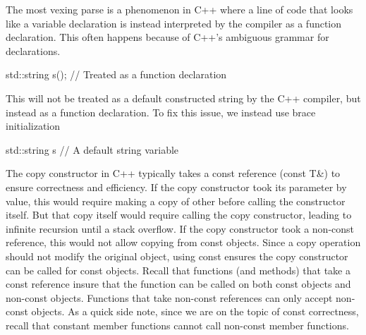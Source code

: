 \documentclass{report}
\begin{document}
    \pagebreak 
    \bigbreak \noindent 
    The most vexing parse is a phenomenon in C++ where a line of code that looks like a variable declaration is instead interpreted by the compiler as a function declaration. This often happens because of C++'s ambiguous grammar for declarations.
    \bigbreak \noindent 
    \begin{cppcode}
    std::string s(); // Treated as a function declaration
    \end{cppcode}
    \bigbreak \noindent 
    This will not be treated as a default constructed string by the C++ compiler, but instead as a function declaration. To fix this issue, we instead use brace initialization
    \bigbreak \noindent 
    \begin{cppcode}
        std::string s{} // A default string variable
    \end{cppcode}

    \pagebreak 
    \bigbreak \noindent 
    The copy constructor in C++ typically takes a const reference (const T\&) to ensure correctness and efficiency. If the copy constructor took its parameter by value, this would require making a copy of other before calling the constructor itself. But that copy itself would require calling the copy constructor, leading to infinite recursion until a stack overflow.
    \bigbreak \noindent 
    If the copy constructor took a non-const reference, this would not allow copying from const objects.
    \bigbreak \noindent 
    Since a copy operation should not modify the original object, using const ensures the copy constructor can be called for const objects.
    \bigbreak \noindent 
    Recall that functions (and methods) that take a const reference insure that the function can be called on both const objects and non-const objects. Functions that take non-const references can only accept non-const objects.
    \bigbreak \noindent 
    As a quick side note, since we are on the topic of const correctness, recall that constant member functions cannot call non-const member functions.

    \bigbreak \noindent 
\end{document}
